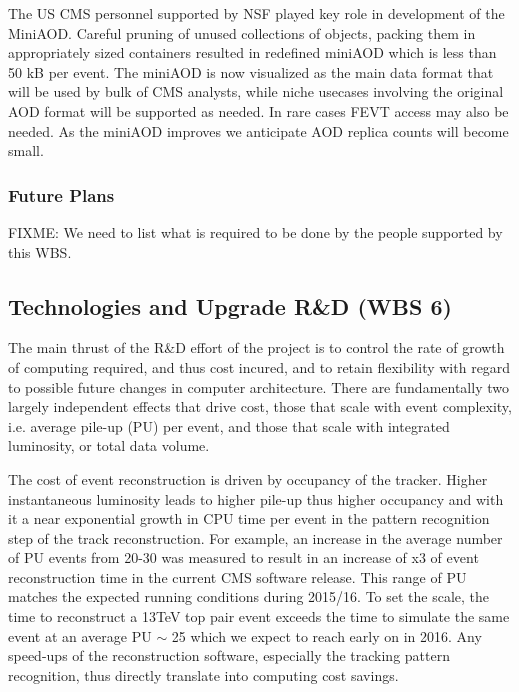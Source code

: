 \documentclass[11pt,a4paper]{article}
\begin{document}
The US CMS personnel supported by NSF played key role in development
of the MiniAOD.  Careful pruning of unused collections of objects, packing them
in appropriately sized containers resulted in redefined miniAOD which
is less than 50 kB per event. The miniAOD is now visualized as the main data format that will
be used by bulk of CMS analysts, while niche usecases involving the
original AOD format will be supported as needed. In rare cases FEVT
access may also be needed.  As the miniAOD improves we anticipate AOD
replica counts will become small. 

\subsubsection{Future Plans}

{FIXME: We need to list what is required to be done by the people
  supported by this WBS.}

\subsection{Technologies and Upgrade R\&D (WBS 6)}

The main thrust of the R\&D effort of the project is to control the
rate of growth of computing required, and thus cost incured, and to retain
flexibility with regard to possible future changes in computer architecture.  
There are fundamentally two largely independent effects that drive cost,
those that scale with event complexity, i.e. average pile-up (PU) per event, 
and those that scale with integrated luminosity, or total data volume.

The cost of event reconstruction is driven by occupancy of the tracker.
Higher instantaneous luminosity leads to higher pile-up thus higher
occupancy and with it a near exponential growth in CPU time per event 
in the pattern recognition step of the track reconstruction. 
For example, an increase in the average number of PU events from 20-30
was measured to result in an increase of x3 of event reconstruction time in the current CMS software release. 
This range of PU matches the expected running conditions during 2015/16.
To set the scale, the time to reconstruct a 13TeV top pair event exceeds the time to simulate
the same event at an average PU $\sim$ 25 which we expect to reach early on in 2016.
Any speed-ups of the reconstruction software, especially the tracking pattern recognition, 
thus directly translate into computing cost savings.
\end{document}
